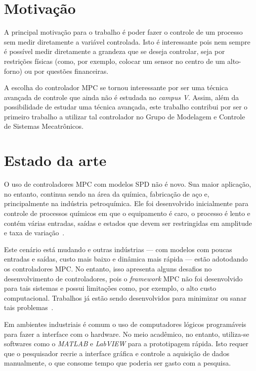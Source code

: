\section{Motivação}%
\label{sec:motivacao}

A principal motivação para o trabalho é poder fazer o controle de um processo
sem medir diretamente a variável controlada. Isto é interessante pois nem sempre
é possível medir diretamente a grandeza que se deseja controlar, seja por
restrições físicas (como, por exemplo, colocar um sensor no centro de um
alto-forno) ou por questões financeiras.

A escolha do controlador \ac{MPC} se tornou interessante por ser uma técnica
avançada de controle que ainda não é estudada no \textit{campus V}. Assim, além
da possibilidade de estudar uma técnica avançada, este trabalho contribui por
ser o primeiro trabalho a utilizar tal controlador no Grupo de Modelagem e
Controle de Sistemas Mecatrônicos.

\section{Estado da arte}%
\label{sec:estado-da-arte}

O uso de controladores \ac{MPC} com modelos \ac{SPD} não é novo. Sua maior
aplicação, no entanto, continua sendo na área da química, fabricação de aço e,
principalmente na indústria petroquímica. Ele foi desenvolvido inicialmente para
controle de processos químicos em que o equipamento é caro, o processo é lento
e contém várias entradas, saídas e estados que devem ser restringidas em
amplitude e taxa de variação~\cite{article:cairano}.

Este cenário está mudando e outras indústrias --- com modelos com poucas
entradas e saídas, custo mais baixo e dinâmica mais rápida --- estão adotodando
os controladores \ac{MPC}\@. No entanto, isso apresenta alguns desafios no
desenvolvimento de controladores, pois o \textit{framework} \ac{MPC} não foi
desenvolvido para tais sistemas e possui limitações como, por exemplo, o alto
custo computacional. Trabalhos já estão sendo desenvolvidos para minimizar ou
sanar tais problemas~\cite{article:cairano}.

Em ambientes industriais é comum o uso de computadores lógicos programáveis para
fazer a interface com o hardware. No meio acadêmico, no entanto, utiliza-se
softwares como o \textit{MATLAB} e \textit{LabVIEW} para a prototipagem rápida.
Isto requer que o pesquisador recrie a interface gráfica e controle a aquisição
de dados manualmente, o que consome tempo que poderia ser gasto com a pesquisa.

